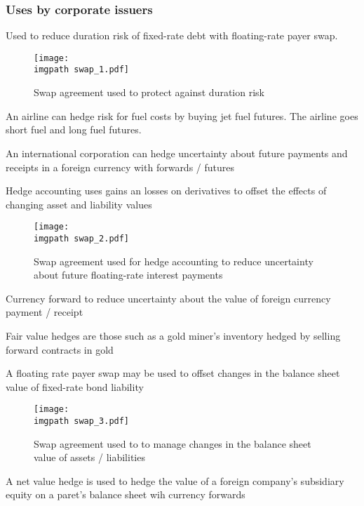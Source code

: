 \documentclass[../notes_compiled.tex]{subfiles}
\begin{document}
\subsubsection*{Uses by corporate issuers}
\begin{itemize}
\item Used to reduce duration risk of fixed-rate debt with floating-rate payer swap.
\begin{figure}[h]
  \centering
  \texttt{[image: \\imgpath swap\_1.pdf]}
  \caption{Swap agreement used to protect against duration risk}
\end{figure}
{\color{RedViolet}
\item An airline can hedge risk for fuel costs by buying jet fuel futures. The airline goes short fuel and long fuel futures.
\item An international corporation can hedge uncertainty about future payments and receipts in a foreign currency with forwards / futures
}
\item Hedge accounting uses gains an losses on derivatives to offset the effects of changing asset and liability values
\begin{figure}[h]
  \centering
  \texttt{[image: \\imgpath swap\_2.pdf]}
  \caption{Swap agreement used for hedge accounting to reduce uncertainty about future floating-rate interest payments}
\end{figure}
{\color{RedViolet}
\item Currency forward to reduce uncertainty about the value of foreign currency payment / receipt
}

\item Fair value hedges are those such as a gold miner’s inventory hedged by selling forward contracts in gold
\item A floating rate payer swap may be used to offset changes in the balance sheet value of fixed-rate bond liability
\begin{figure}[h]
  \centering
  \texttt{[image: \\imgpath swap\_3.pdf]}
  \caption{Swap agreement used to to manage changes in the balance sheet value of assets / liabilities}
\end{figure}
\item A net value hedge is used to hedge the value of a foreign company’s subsidiary equity on a paret’s balance sheet wih currency forwards

\end{itemize}
\end{document}
